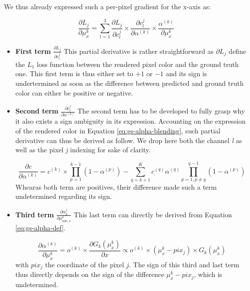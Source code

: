 We thus already expressed such a per-pixel gradient for the x-axis as: 

\begin{equation}
    \label{eq:perpix-grad-appendix}
    \frac{\partial L_{j}}{\partial \mu^{k}_{x}} = \sum \limits_{l=1}^{3} \frac{\partial L_{j}}{\partial c_{l}^{j}}\times \frac{\partial c_{l}^{j}}{\partial \alpha^{(k)}} \times \frac{\alpha^{(k)}}{\partial \mu^{k}_{x}}
    \end{equation}

\begin{itemize}
    
    \item \textbf{First term} $\frac{\partial L_{j}}{\partial c_{l}^{j}}$ 
This partial derivative is rather straightforward as $\partial L_{j}$ define the $L_{1}$ loss function between the rendered pixel color and the ground truth one. This first term is thus either set to $+1$ or $-1$ and its sign is undertermined as soon as the difference between predicted and ground truth color can either be positive or negative. 

    \item \textbf{Second term} $\frac{\partial c_{l}^{j}}{\partial \alpha^{(k)}}$ 
The second term has to be developed to fully grasp why it also exists a sign ambiguity in its expression. Accounting on the expression of the rendered color in Equation \eqref{eq:gs-alpha-blending}, such partial derivative can thus be derived as follow. We drop here both the channel  \textit{l} as well as the pixel \textit{j} indexing for sake of clarity.  

\begin{equation}
    \frac{\partial c}{\partial \alpha^{(k)}} = c^{(k)} \times \prod \limits_{p=1}^{k-1}(1 - \alpha^{(p)}) - \sum \limits_{q=k+1}^{K} c^{(q)}\alpha^{(q)}\prod \limits_{p=1,p\neq q}^{q-1}(1 - \alpha^{(p)})
\end{equation}
Whearas both term are positives, their difference made such a term undetermined regarding its sign. 

    \item \textbf{Third term} $\frac{\partial \alpha_{k}^{j}}{\partial \mu^{k}_{ndc,x}}$ 
This last term can directly be derived from Equation \eqref{eq:gs-alpha-def}. 

\begin{equation}
    \frac{\partial \alpha^{(k)}}{\partial \mu^{k}_{x}} =  o^{(k)} \times \frac{\partial G_{k}(\mu^{k}_{x})}{\partial x} \propto o^{(k)} \times (\mu^{k}_{x} - pix_{j}) \times G_{k}(\mu^{k}_{x})
\end{equation}
with $pix_{j}$ the coordinate of the pixel $j$. The sign of this third and last term thus directly depends on the sign of the difference $\mu^{k}_{x} - pix_{j}$, which is undetermined. 

\end{itemize}






